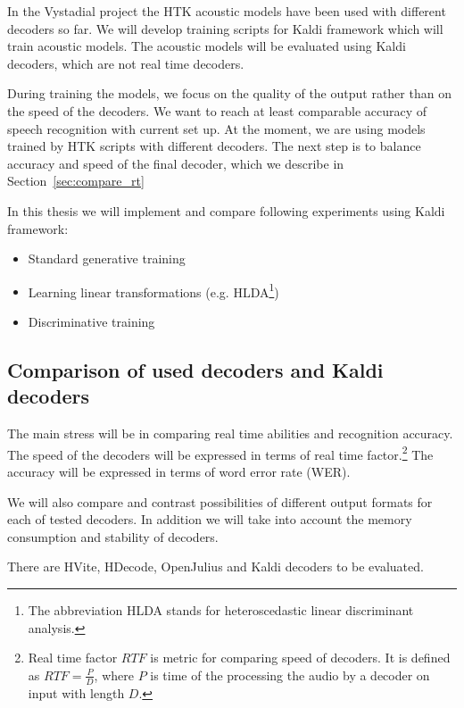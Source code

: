 In the Vystadial project the HTK acoustic models have been used with different decoders so far. We will develop training scripts for Kaldi framework which will train acoustic models. The acoustic models will be evaluated using Kaldi decoders, which are not real time decoders. 

During training the models, we focus on the quality of the output rather than on the speed of the decoders. We want to reach at least comparable accuracy of speech recognition with current set up. At the moment, we are using models trained by HTK scripts with different decoders. The next step is to balance accuracy and speed of the final decoder, which we describe in Section~\ref{sec:compare_rt}

In this thesis we will implement and compare following experiments using Kaldi framework:
\begin{itemize}
    \item Standard generative training
    \item Learning linear transformations (e.g. HLDA\footnote{The abbreviation HLDA stands for heteroscedastic linear discriminant analysis.})
    \item Discriminative training 
\end{itemize}

 

\subsection{Comparison of used decoders and Kaldi decoders} 
\label{sub:compare_rt}
The main stress will be in comparing real time abilities and recognition accuracy. The speed of the decoders will be expressed in terms of real time factor.\footnote{Real time factor $RTF$ is metric for comparing speed of decoders. It is defined as $RTF = \frac{P}{D}$, where $P$ is time of the processing the audio by a decoder on input with length $D$.} The accuracy will be expressed in terms of word error rate (WER).

We will also compare and contrast possibilities of different output formats for each of tested decoders.
In addition we will take into account the memory consumption and stability of decoders.

There are HVite, HDecode, OpenJulius and Kaldi decoders to be evaluated.


